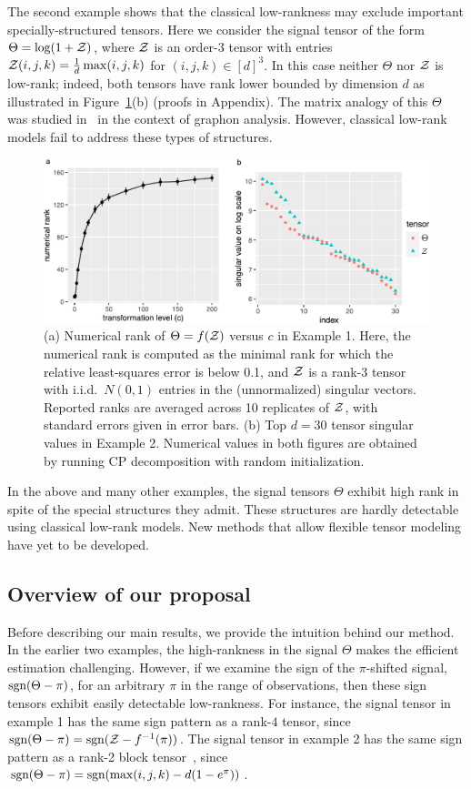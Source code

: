 \documentclass{article}
\theoremstyle{plain}
\theoremstyle{definition}
\def\sign{\textup{sgn}}
\begin{document}
The second example shows that the classical low-rankness may exclude important specially-structured tensors. Here we consider the signal tensor of the form $\Theta=\log(1+\mathcal{Z})$, where $\mathcal{Z}$ is an order-3 tensor with entries $\mathcal{Z}(i,j,k)={1\over d}\max(i,j,k)$ for $(i,j,k)\in[d]^3$. In this case neither $\Theta$ nor $\mathcal{Z}$ is low-rank; indeed, both tensors have rank lower bounded by dimension $d$ as illustrated in Figure~\ref{fig:example}(b) (proofs in Appendix). The matrix analogy of this $\Theta$ was studied in~\citet{chan2014consistent} in the context of graphon analysis. However, classical low-rank models fail to address these types of structures. 
\begin{figure}[h]
\includegraphics[width=.47\textwidth]{example_comb.pdf}
\caption{(a) Numerical rank of $\Theta=f(\mathcal{Z})$ versus $c$ in Example 1. Here, the numerical rank is computed as the minimal rank for which the relative least-squares error is below 0.1, and $\mathcal{Z}$ is a rank-3 tensor with i.i.d.\ $N(0,1)$ entries in the (unnormalized) singular vectors. Reported ranks are averaged across 10 replicates of $\mathcal{Z}$, with standard errors given in error bars. (b) Top $d=30$ tensor singular values in Example 2. Numerical values in both figures are obtained by running CP decomposition with random initialization.}\label{fig:example}
\end{figure}
In the above and many other examples, the signal tensors $\Theta$ exhibit high rank in spite of the special structures they admit. These structures are hardly detectable using classical low-rank models. New methods that allow flexible tensor modeling have yet to be developed. 

\subsection{Overview of our proposal}
Before describing our main results, we provide the intuition behind our method. In the earlier two examples, the high-rankness in the signal $\Theta$ makes the efficient estimation challenging. However, if we examine the sign of the $\pi$-shifted signal, $\sign(\Theta-\pi)$, for an arbitrary $\pi$ in the range of observations, then these sign tensors exhibit easily detectable low-rankness. For instance, the signal tensor in example 1 has the same sign pattern as a rank-$4$ tensor, since $\sign(\Theta-\pi)=\sign(\tZ-f^{-1}(\pi))$. The signal tensor in example 2 has the same sign pattern as a rank-2 block tensor~\cite{wang2019multiway}, since $\sign(\Theta-\pi)=\sign(\max(i,j,k)-d(1-e^{\pi}))$.
\end{document}
